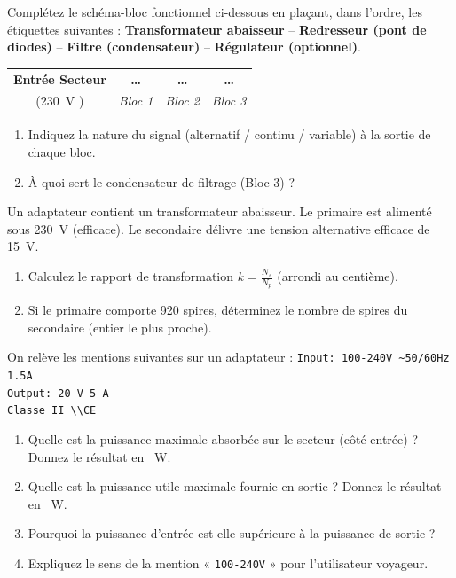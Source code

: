 \documentclass[11pt]{article}
\begin{document}
\begin{exercice}
Complétez le schéma-bloc fonctionnel ci-dessous en plaçant, dans l'ordre, les étiquettes suivantes :
\textbf{Transformateur abaisseur} -- \textbf{Redresseur (pont de diodes)} -- \textbf{Filtre (condensateur)} -- \textbf{Régulateur (optionnel)}.

\begin{center}
\begin{tabular}{|c|c|c|c|}
\hline
\textbf{Entrée Secteur} & \textbf{\dots} & \textbf{\dots} & \textbf{\dots} \\
(\SI{230}{V} \text{\textasciitilde}) & \textit{Bloc 1} & \textit{Bloc 2} & \textit{Bloc 3} \\
\hline
\end{tabular}
\end{center}
\begin{enumerate}
    \item Indiquez la nature du signal (alternatif / continu / variable) à la sortie de chaque bloc.
    \item À quoi sert le condensateur de filtrage (Bloc 3) ?
\end{enumerate}
\end{exercice}

\begin{exercice}
Un adaptateur contient un transformateur abaisseur. Le primaire est alimenté sous \SI{230}{V} (efficace). Le secondaire délivre une tension alternative efficace de \SI{15}{V}.
\begin{enumerate}
    \item Calculez le rapport de transformation $k = \frac{N_s}{N_p}$ (arrondi au centième).
    \item Si le primaire comporte \num{920} spires, déterminez le nombre de spires du secondaire (entier le plus proche).
\end{enumerate}
\end{exercice}

\begin{exercice}
On relève les mentions suivantes sur un adaptateur : 
\texttt{Input: 100-240V \textasciitilde 50/60Hz 1.5A} \\
\texttt{Output: \SI{20}{V} \text{---} \SI{5}{A}} \\
\texttt{Classe II \textbackslash\textbackslash \quad CE}
\begin{enumerate}
    \item Quelle est la puissance maximale absorbée sur le secteur (côté entrée) ? Donnez le résultat en \SI{}{W}.
    \item Quelle est la puissance utile maximale fournie en sortie ? Donnez le résultat en \SI{}{W}.
    \item Pourquoi la puissance d'entrée est-elle supérieure à la puissance de sortie ?
    \item Expliquez le sens de la mention « \texttt{100-240V} » pour l'utilisateur voyageur.
\end{enumerate}
\end{exercice}
\end{document}
